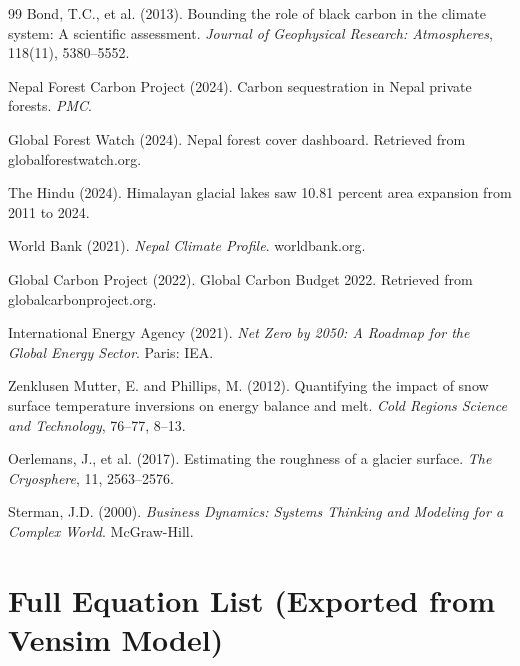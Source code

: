 \documentclass[12pt, a4paper]{article}
\begin{document}
\begin{thebibliography}{99}
 Bond, T.C., et al. (2013). Bounding the role of black carbon in the climate system: A scientific assessment. \textit{Journal of Geophysical Research: Atmospheres}, 118(11), 5380--5552.

 Nepal Forest Carbon Project (2024). Carbon sequestration in Nepal private forests. \textit{PMC}.

 Global Forest Watch (2024). Nepal forest cover dashboard. Retrieved from globalforestwatch.org.

 The Hindu (2024). Himalayan glacial lakes saw 10.81 percent area expansion from 2011 to 2024.

 World Bank (2021). \textit{Nepal Climate Profile}. worldbank.org.

 Global Carbon Project (2022). Global Carbon Budget 2022. Retrieved from globalcarbonproject.org.

 International Energy Agency (2021). \textit{Net Zero by 2050: A Roadmap for the Global Energy Sector}. Paris: IEA.

 Zenklusen Mutter, E. and Phillips, M. (2012). Quantifying the impact of snow surface temperature inversions on energy balance and melt. \textit{Cold Regions Science and Technology}, 76--77, 8--13.

 Oerlemans, J., et al. (2017). Estimating the roughness of a glacier surface. \textit{The Cryosphere}, 11, 2563--2576.

 Sterman, J.D. (2000). \textit{Business Dynamics: Systems Thinking and Modeling for a Complex World}. McGraw-Hill.

\end{thebibliography}

\appendix
\section{Full Equation List (Exported from Vensim Model)}
\end{document}
